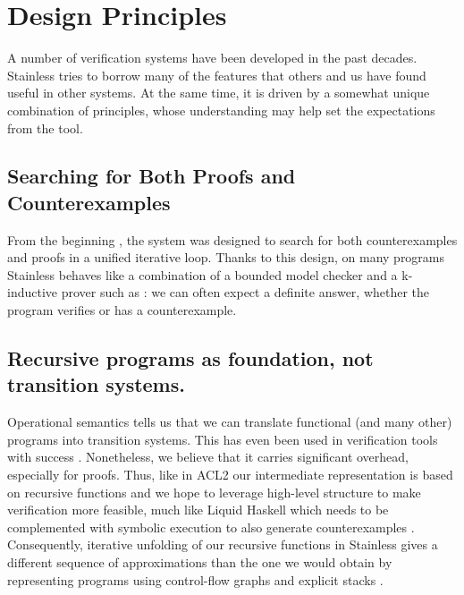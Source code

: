 \section{Design Principles}

A number of verification systems have been developed in the past decades.
Stainless tries to borrow many of the features that others and us have
found useful in other systems. At the same time, it is driven by a somewhat
unique combination of principles, whose understanding may help set the
expectations from the tool.

\subsection{Searching for Both Proofs and Counterexamples}

From the beginning
\cite{SuterETAL11SatisfiabilityModuloRecursivePrograms},
the system was designed to search for both
counterexamples and proofs in a unified iterative loop.
Thanks to this design, on many programs Stainless behaves
like a combination of a bounded model checker and a
k-inductive prover such as \cite{kind2}: we can often expect a
definite answer, whether the program verifies or has a
counterexample.

\subsection{Recursive programs as foundation, not transition systems.}
Operational semantics tells us that we can translate functional
(and many other) programs into transition systems. This has even
been used in verification tools with success \cite{}. Nonetheless, we believe that it carries
significant overhead, especially for proofs. Thus, like in ACL2 \cite{More2019milestones,DBLP:conf/ijcai/BoyerM73} our intermediate
representation is based on recursive functions \cite{SuterETAL11SatisfiabilityModuloRecursivePrograms}
and we hope to leverage high-level structure to make verification more feasible, much like
Liquid Haskell \cite{vazou2016liquid} which needs to be complemented with symbolic execution
to also generate counterexamples \cite{DBLP:conf/pldi/HallahanXBJP19}.
Consequently,
iterative unfolding of our recursive functions in Stainless gives a different sequence of approximations 
than the one we would obtain by representing programs using control-flow graphs and explicit stacks
\cite{pluscal}.

